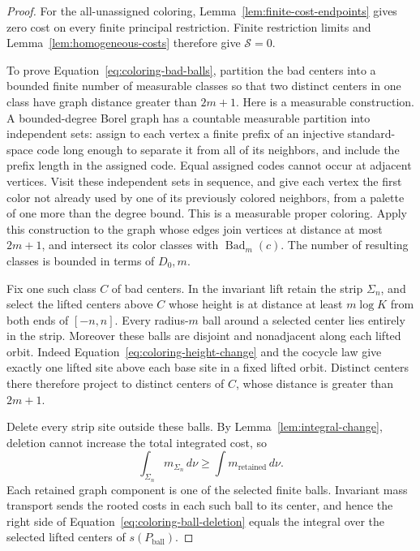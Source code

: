\begin{proof}
For the all-unassigned coloring, Lemma~\ref{lem:finite-cost-endpoints}
gives zero cost on every finite principal restriction. Finite restriction
limits and Lemma~\ref{lem:homogeneous-costs} therefore give $\mathcal S=0$.

To prove Equation~\eqref{eq:coloring-bad-balls}, partition the bad centers
into a bounded finite number of measurable classes so that two distinct
centers in one class have graph distance greater than $2m+1$.  Here is a
measurable construction.  A bounded-degree Borel graph has a countable
measurable partition into independent sets: assign to each vertex a
finite prefix of an injective standard-space code long enough to
separate it from all of its neighbors, and include the prefix length in
the assigned code.  Equal assigned codes cannot occur at adjacent
vertices.  Visit these independent sets in sequence, and give each
vertex the first color not already used by one of its previously colored
neighbors, from a palette of one more than the degree bound.  This is a
measurable proper coloring.  Apply this construction to the graph whose
edges join vertices at distance at most $2m+1$, and intersect its color
classes with $\operatorname{Bad}_m(c)$.  The number of resulting classes
is bounded in terms of $D_0,m$.

Fix one such class $C$ of bad centers.  In the invariant lift retain the
strip $\Sigma_n$, and select the lifted centers above $C$ whose height is
at distance at least $m\log K$ from both ends of $[-n,n]$.  Every
radius-$m$ ball around a selected center lies entirely in the strip.
Moreover these balls are disjoint and nonadjacent along each lifted
orbit.  Indeed Equation~\eqref{eq:coloring-height-change} and the cocycle
law give exactly one lifted site above each base site in a fixed lifted
orbit.  Distinct centers there therefore project to distinct centers of
$C$, whose distance is greater than $2m+1$.

Delete every strip site outside these balls.  By
Lemma~\ref{lem:integral-change}, deletion cannot increase the total
integrated cost, so
\begin{equation}
 \int_{\Sigma_n}m_{\Sigma_n}\,d\nu
       \geq\int m_{\mathrm{retained}}\,d\nu.
 \label{eq:coloring-ball-deletion}
\end{equation}
Each retained graph component is one of the selected finite balls.
Invariant mass transport sends the rooted costs in each such ball to
its center, and hence the right side of
Equation~\eqref{eq:coloring-ball-deletion} equals the integral over the
selected lifted centers of $s(P_{\mathrm{ball}})$.


\end{proof}

